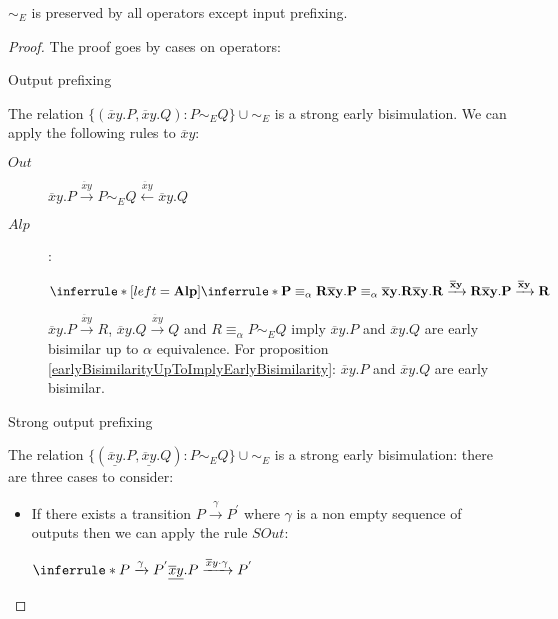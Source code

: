 \begin{lemma}\label{earlyBisimulationProprerties}
  $\sim_{E}$ is preserved by all operators except input prefixing.
  \begin{proof}
    The proof goes by cases on operators:
    \begin{description}
      \item[Output prefixing]
    \end{description}
	The relation $\{(\overline{x}y.P, \overline{x}y.Q): P\sim_{E} Q\} \cup \sim_{E}$ is a strong early bisimulation. We can apply the following rules to $\overline{x}y$:
	\begin{description}
	  \item[$Out$]
	    $\overline{x}y.P \xrightarrow{\overline{x}y} P \sim_{E} Q \stackrel{\overline{x}y}{\longleftarrow} \overline{x}y.Q$
	  \item[$Alp$]:
	    \begin{center}
	      $\inferrule* [left=\bf{Alp}]{
		  \inferrule* {
		    P \equiv_{\alpha} R
		  }{
		    \overline{x}y.P \equiv_{\alpha} \overline{x}y.R
		  }
		\\
		  \overline{x}y.R \xrightarrow{\overline{x}y} R
	      }{
		  \overline{x}y.P \xrightarrow{\overline{x}y} R
	      }$
	    \end{center}
	    $\overline{x}y.P \xrightarrow{\overline{x}y} R$, $\overline{x}y.Q \xrightarrow{\overline{x}y} Q$ and $R \equiv_{\alpha} P \sim_{E} Q$ imply $\overline{x}y.P$ and $\overline{x}y.Q$ are early bisimilar up to $\alpha$ equivalence. For proposition \ref{earlyBisimilarityUpToImplyEarlyBisimilarity}: $\overline{x}y.P$ and $\overline{x}y.Q$ are early bisimilar.
	\end{description}
    \begin{description}
      \item[Strong output prefixing]
    \end{description}
	The relation $\{(\underline{\overline{x}y}.P, \underline{\overline{x}y}.Q): P\sim_{E} Q\} \cup \sim_{E}$ is a strong early bisimulation: there are three cases to consider:
	\begin{itemize}
	  \item 
	    If there exists a transition $P \xrightarrow{\gamma} P^{'}$ where $\gamma$ is a non empty sequence of outputs then we can apply the rule $SOut$:
	    \begin{center}
	      $\inferrule* {
		P \xrightarrow{\gamma} P^{'}
	      }{
		\underline{\overline{x}y}.P \xrightarrow{\overline{x}y \cdot \gamma} P^{'}
	      }$

\end{center}
\end{itemize}
\end{proof}
\end{lemma}
